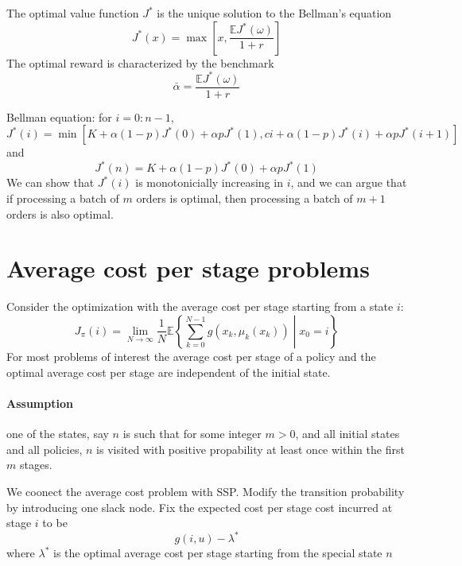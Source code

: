 \begin{example}
The optimal value function $J^*$ is the unique solution to the Bellman's equation
\[
J^*(x)=\max\left[x,\frac{\mathbb{E}J^*(\omega)}{1+r}\right]
\]
The optimal reward is characterized by the benchmark
\[
\bar{\alpha}=\frac{\mathbb{E}J^*(\omega)}{1+r}
\]

\end{example}

\begin{example}[Manufacturering]
Bellman equation: for $i=0:n-1$,
\[
J^*(i) = \min[K+\alpha(1-p)J^*(0)+\alpha pJ^*(1),ci+\alpha(1-p)J^*(i)+\alpha pJ^*(i+1)]
\]
and
\[
J^*(n) = K+\alpha(1-p)J^*(0)+\alpha pJ^*(1)
\]
We can show that $J^*(i)$ is monotonicially increasing in $i$, and we can argue that if processing a batch of $m$ orders is optimal, then processing a batch of $m+1$ orders is also optimal.
\end{example}




\section{Average cost per stage problems}
Consider the optimization with the average cost per stage starting from a state $i$:
\[
J_{\pi}(i) = \lim_{N\to\infty}\frac{1}{N}\mathbb{E}\left\{
\sum_{k=0}^{N-1}g(x_k,\mu_k(x_k))\middle|x_0=i
\right\}
\]
For most problems of interest the average cost per stage of a policy and the optimal average cost per stage are independent of the initial state.
\paragraph{Assumption}
one of the states, say $n$ is such that for some integer $m>0$, and all initial states and all policies, $n$ is visited with positive propability at least once within the first $m$ stages.

We coonect the average cost problem with SSP. Modify the transition probability by introducing one slack node. Fix the expected cost per stage cost incurred at stage $i$ to be
\[
g(i,u)-\lambda^*
\]
where $\lambda^*$ is the optimal average cost per stage starting from the special state $n$

